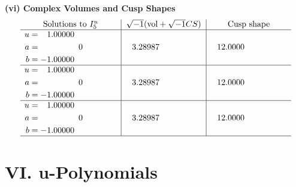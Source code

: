\documentclass[1p]{elsarticle_modified}
\theoremstyle{definition}
\newcommand{\I}{\sqrt{-1}}
\begin{document}
\newpage\flushleft \textbf{(vi) Complex Volumes and Cusp Shapes}
$$\begin{array}{c|c|c}  
\text{Solutions to }I^u_{5}& \I (\text{vol} + \sqrt{-1}CS) & \text{Cusp shape}\\
 \hline 
\begin{aligned}
u &= \phantom{-}1.00000\phantom{ +0.000000I} \\
a &= \phantom{-0.000000 } 0 \\
b &= -1.00000\phantom{ +0.000000I}\end{aligned}
 & \phantom{-}3.28987\phantom{ +0.000000I} & \phantom{-}12.0000\phantom{ +0.000000I} \\ \hline\begin{aligned}
u &= \phantom{-}1.00000\phantom{ +0.000000I} \\
a &= \phantom{-0.000000 } 0 \\
b &= -1.00000\phantom{ +0.000000I}\end{aligned}
 & \phantom{-}3.28987\phantom{ +0.000000I} & \phantom{-}12.0000\phantom{ +0.000000I} \\ \hline\begin{aligned}
u &= \phantom{-}1.00000\phantom{ +0.000000I} \\
a &= \phantom{-0.000000 } 0 \\
b &= -1.00000\phantom{ +0.000000I}\end{aligned}
 & \phantom{-}3.28987\phantom{ +0.000000I} & \phantom{-}12.0000\phantom{ +0.000000I}\\
 \hline 
 \end{array}$$\newpage
\newpage\renewcommand{\arraystretch}{1}
\centering \section*{ VI. u-Polynomials}
\end{document}

